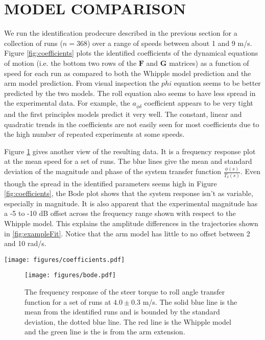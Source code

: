 \documentclass[twocolumn,10pt]{asme2e}
\begin{document}
\section*{MODEL COMPARISON}
We run the identification prodecure described in the previous section for a
collection of runs ($n=368$) over a range of speeds between about 1 and 9 m/s.
Figure \ref{fig:coefficients} plots the identified coefficients of the
dynamical equations of motion (i.e. the bottom two rows of the \(\mathbf{F}\)
and \(\mathbf{G}\) matrices) as a function of speed for each run as compared to
both the Whipple model prediction and the arm model prediction. From visual
inspection the $\ddot{phi}$ equation seems to be better predicted by the two
models. The roll equation also seems to have less spread in the experimental data. For
example, the \(a_{\ddot{\phi}\delta}\) coefficient appears to be very tight and the
first principles models predict it very well. The constant, linear and
quadratic trends in the coefficients are not easily seen for most coefficients
due to the high number of repeated experiments at some speeds.

Figure \ref{fig:bode} gives another view of the resulting data. It is a
frequency response plot at the mean speed for a set of runs. The blue lines
give the mean and standard deviation of the magnitude and phase of the system
transfer function \(\frac{\phi(s)}{T_\delta(s)}\). Even though the spread in
the identified parameters seems high in Figure \ref{fig:coefficients}, the Bode
plot shows that the system response isn't as variable, especially in magnitude.
It is also apparent that the experimental magnitude has a -5 to -10 dB offset
across the frequency range shown with respect to the Whipple model. This
explains the amplitude differences in the trajectories shown in
\ref{fig:exampleFit}. Notice that the arm model has little to no offset between
2 and 10 rad/s.

\begin{figure*}
	\texttt{[image: figures/coefficients.pdf]}
	\caption{The coefficients of the linear dynamical equations of motion plotted
	as a function of speed. Each blue dot is a single experiment. The green line
	is the Whipple model and the magenta line is the Arm model. Only experiments
	with a mean fit percentage greater than zero are shown.}
	\label{fig:coefficients}
\end{figure*}

\begin{figure}
	\texttt{[image: figures/bode.pdf]}
	\caption{The frequency response of the steer torque to roll angle transfer
	function for a set of runs at $4.0 \pm 0.3$ m/s. The solid blue line is the
	mean from the identified runs and is bounded by the standard deviation, the
	dotted blue line. The red line is the Whipple model and the green line is the
	is from the arm extension.}
	\label{fig:bode}
\end{figure}
\end{document}
